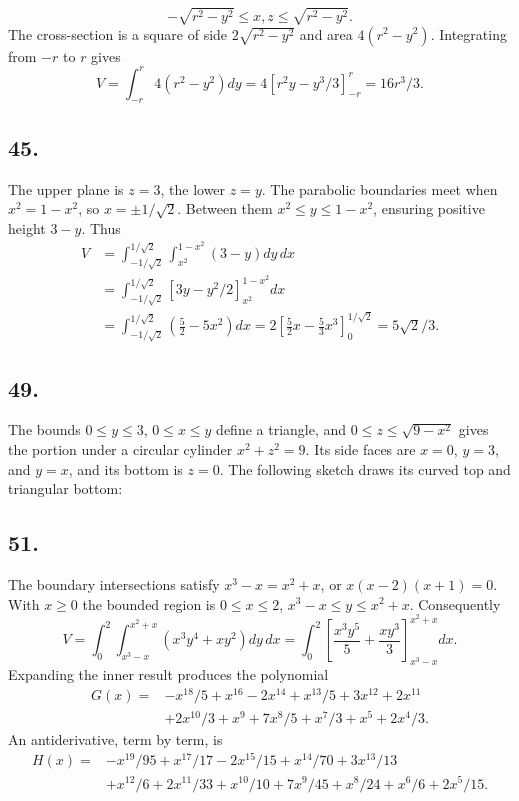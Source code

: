 \documentclass[11pt]{article}
\newcommand{\ex}[1]{\subsection*{#1.}}
\newcommand{\ans}[1]{\boxed{#1}}
\begin{document}
\[-\sqrt{r^2-y^2}\le x,z\le\sqrt{r^2-y^2}.\]
The cross-section is a square of side $2\sqrt{r^2-y^2}$ and area $4(r^2-y^2)$. Integrating from $-r$ to $r$ gives
\[V=\int_{-r}^r4(r^2-y^2)dy=4[r^2y-y^3/3]_{-r}^r=\ans{16r^3/3}.\]
\ex{45}
The upper plane is $z=3$, the lower $z=y$. The parabolic boundaries meet when $x^2=1-x^2$, so $x=\pm1/\sqrt2$. Between them $x^2\le y\le1-x^2$, ensuring positive height $3-y$. Thus
\begin{align*}
V&=\int_{-1/\sqrt2}^{1/\sqrt2}\int_{x^2}^{1-x^2}(3-y)dy\,dx\\
&=\int_{-1/\sqrt2}^{1/\sqrt2}[3y-y^2/2]_{x^2}^{1-x^2}dx\\
&=\int_{-1/\sqrt2}^{1/\sqrt2}\left(\frac52-5x^2\right)dx
=2\left[\frac52x-\frac53x^3\right]_0^{1/\sqrt2}=\ans{5\sqrt2/3}.
\end{align*}
\ex{49}
The bounds $0\le y\le3$, $0\le x\le y$ define a triangle, and $0\le z\le\sqrt{9-x^2}$ gives the portion under a circular cylinder $x^2+z^2=9$. Its side faces are $x=0$, $y=3$, and $y=x$, and its bottom is $z=0$. The following sketch draws its curved top and triangular bottom:
\begin{center}\end{center}
\ex{51}
The boundary intersections satisfy $x^3-x=x^2+x$, or $x(x-2)(x+1)=0$. With $x\ge0$ the bounded region is $0\le x\le2$, $x^3-x\le y\le x^2+x$. Consequently
\[V=\int_0^2\int_{x^3-x}^{x^2+x}(x^3y^4+xy^2)dy\,dx
=\int_0^2\left[\frac{x^3y^5}{5}+\frac{xy^3}{3}\right]_{x^3-x}^{x^2+x}dx.\]
Expanding the inner result produces the polynomial
\begin{align*}
G(x)={}&-x^{18}/5+x^{16}-2x^{14}+x^{13}/5+3x^{12}+2x^{11}\\
&+2x^{10}/3+x^9+7x^8/5+x^7/3+x^5+2x^4/3.
\end{align*}
An antiderivative, term by term, is
\begin{align*}
H(x)={}&-x^{19}/95+x^{17}/17-2x^{15}/15+x^{14}/70+3x^{13}/13\\
&+x^{12}/6+2x^{11}/33+x^{10}/10+7x^9/45+x^8/24+x^6/6+2x^5/15.
\end{align*}
\end{document}
